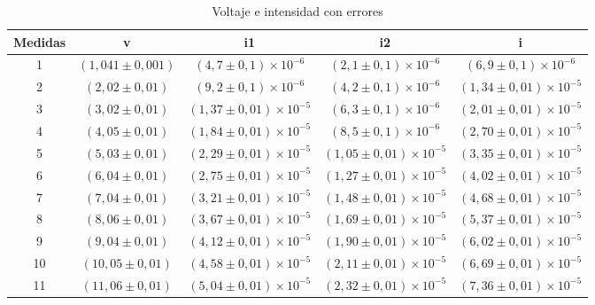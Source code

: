 \begin{table}[h]
\centering
\begin{tabular}{|c|c|c|c|c|}
\hline
Medidas & v & i1 & i2 & i \\
\hline
1 & $(1,041 \pm 0,001)$ & $(4,7 \pm 0,1) \times 10^{-6}$ & $(2,1 \pm 0,1) \times 10^{-6}$ & $(6,9 \pm 0,1) \times 10^{-6}$ \\
2 & $(2,02 \pm 0,01)$ & $(9,2 \pm 0,1) \times 10^{-6}$ & $(4,2 \pm 0,1) \times 10^{-6}$ & $(1,34 \pm 0,01) \times 10^{-5}$ \\
3 & $(3,02 \pm 0,01)$ & $(1,37 \pm 0,01) \times 10^{-5}$ & $(6,3 \pm 0,1) \times 10^{-6}$ & $(2,01 \pm 0,01) \times 10^{-5}$ \\
4 & $(4,05 \pm 0,01)$ & $(1,84 \pm 0,01) \times 10^{-5}$ & $(8,5 \pm 0,1) \times 10^{-6}$ & $(2,70 \pm 0,01) \times 10^{-5}$ \\
5 & $(5,03 \pm 0,01)$ & $(2,29 \pm 0,01) \times 10^{-5}$ & $(1,05 \pm 0,01) \times 10^{-5}$ & $(3,35 \pm 0,01) \times 10^{-5}$ \\
6 & $(6,04 \pm 0,01)$ & $(2,75 \pm 0,01) \times 10^{-5}$ & $(1,27 \pm 0,01) \times 10^{-5}$ & $(4,02 \pm 0,01) \times 10^{-5}$ \\
7 & $(7,04 \pm 0,01)$ & $(3,21 \pm 0,01) \times 10^{-5}$ & $(1,48 \pm 0,01) \times 10^{-5}$ & $(4,68 \pm 0,01) \times 10^{-5}$ \\
8 & $(8,06 \pm 0,01)$ & $(3,67 \pm 0,01) \times 10^{-5}$ & $(1,69 \pm 0,01) \times 10^{-5}$ & $(5,37 \pm 0,01) \times 10^{-5}$ \\
9 & $(9,04 \pm 0,01)$ & $(4,12 \pm 0,01) \times 10^{-5}$ & $(1,90 \pm 0,01) \times 10^{-5}$ & $(6,02 \pm 0,01) \times 10^{-5}$ \\
10 & $(10,05 \pm 0,01)$ & $(4,58 \pm 0,01) \times 10^{-5}$ & $(2,11 \pm 0,01) \times 10^{-5}$ & $(6,69 \pm 0,01) \times 10^{-5}$ \\
11 & $(11,06 \pm 0,01)$ & $(5,04 \pm 0,01) \times 10^{-5}$ & $(2,32 \pm 0,01) \times 10^{-5}$ & $(7,36 \pm 0,01) \times 10^{-5}$ \\
\hline
\end{tabular}
\caption{Voltaje e intensidad con errores}
\label{tab:VI}
\end{table}